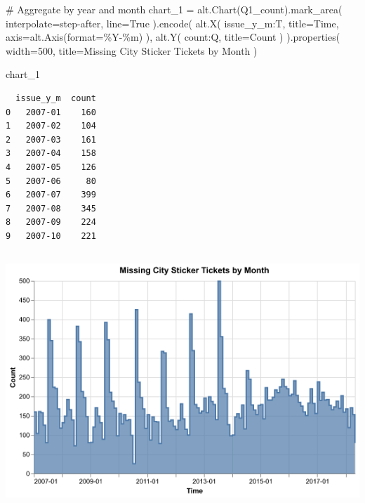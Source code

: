 \documentclass[
  letterpaper,
  DIV=11,
  numbers=noendperiod]{scrartcl}
\newenvironment{Shaded}{\begin{snugshade}}{\end{snugshade}}
\newcommand{\BuiltInTok}[1]{\textcolor[rgb]{0.00,0.23,0.31}{#1}}
\newcommand{\CommentTok}[1]{\textcolor[rgb]{0.37,0.37,0.37}{#1}}
\newcommand{\DecValTok}[1]{\textcolor[rgb]{0.68,0.00,0.00}{#1}}
\newcommand{\NormalTok}[1]{\textcolor[rgb]{0.00,0.23,0.31}{#1}}
\newcommand{\OperatorTok}[1]{\textcolor[rgb]{0.37,0.37,0.37}{#1}}
\newcommand{\StringTok}[1]{\textcolor[rgb]{0.13,0.47,0.30}{#1}}
\newcommand{\VariableTok}[1]{\textcolor[rgb]{0.07,0.07,0.07}{#1}}
\begin{document}
\begin{Shaded}
\begin{Highlighting}[]
\CommentTok{\# Aggregate by year and month}
\NormalTok{chart\_1 }\OperatorTok{=}\NormalTok{ alt.Chart(Q1\_count).mark\_area(}
\NormalTok{    interpolate}\OperatorTok{=}\StringTok{\textquotesingle{}step{-}after\textquotesingle{}}\NormalTok{,}
\NormalTok{    line}\OperatorTok{=}\VariableTok{True}
\NormalTok{).encode(}
\NormalTok{    alt.X(}
        \StringTok{\textquotesingle{}issue\_y\_m:T\textquotesingle{}}\NormalTok{, }
\NormalTok{        title}\OperatorTok{=}\StringTok{\textquotesingle{}Time\textquotesingle{}}\NormalTok{,}
\NormalTok{        axis}\OperatorTok{=}\NormalTok{alt.Axis(}\BuiltInTok{format}\OperatorTok{=}\StringTok{\textquotesingle{}\%Y{-}\%m\textquotesingle{}}\NormalTok{)}
\NormalTok{        ), }
\NormalTok{    alt.Y(}
        \StringTok{\textquotesingle{}count:Q\textquotesingle{}}\NormalTok{, }
\NormalTok{        title}\OperatorTok{=}\StringTok{\textquotesingle{}Count\textquotesingle{}}
\NormalTok{        )}
\NormalTok{).properties(}
\NormalTok{    width}\OperatorTok{=}\DecValTok{500}\NormalTok{,}
\NormalTok{    title}\OperatorTok{=}\StringTok{\textquotesingle{}Missing City Sticker Tickets by Month\textquotesingle{}}
\NormalTok{)}

\NormalTok{chart\_1}
\end{Highlighting}
\end{Shaded}

\begin{verbatim}
  issue_y_m  count
0   2007-01    160
1   2007-02    104
2   2007-03    161
3   2007-04    158
4   2007-05    126
5   2007-06     80
6   2007-07    399
7   2007-08    345
8   2007-09    224
9   2007-10    221
\end{verbatim}

\includegraphics[width=5.73958in,height=3.79167in]{PS2 Answer_files/figure-pdf/cell-7-output-2.png}
\end{document}
